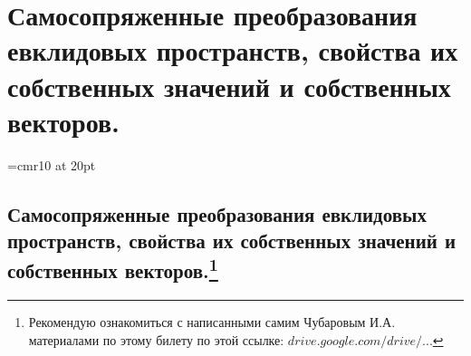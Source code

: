 \chapter{Самосопряженные преобразования евклидовых пространств, свойства их собственных значений и собственных векторов.}

\font\Large=cmr10 at 20pt
\def\fudge#1{\smash{\hbox{\Large#1}}}

\section[Самосопряженные преобразования евклидовых пространств, свойства их собственных значений и собственных векторов.]{Самосопряженные преобразования евклидовых пространств, свойства их собственных значений и собственных векторов.\footnote{Рекомендую ознакомиться с написанными самим Чубаровым И.А. материалами по этому билету по этой ссылке: \href{https://drive.google.com/drive/u/0/folders/0BzuzEyNkpwYDYjVNcE0wa3hqWjA}{$drive.google.com/drive/...$}}}

